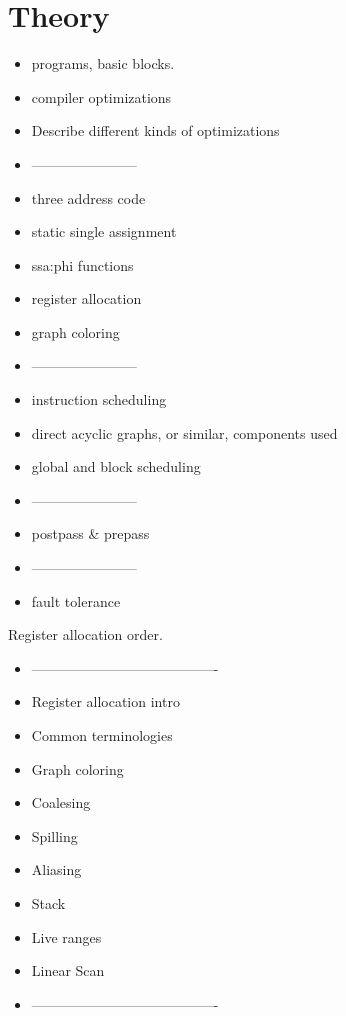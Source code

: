 \chapter{Theory}

\begin{itemize}
    \item programs, basic blocks.
    \item compiler optimizations
    \item Describe different kinds of optimizations
    \item -----------------------
    \item three address code
    \item static single assignment
    \item ssa:phi functions
    \item register allocation
    \item graph coloring 
    \item -----------------------
    \item instruction scheduling
    \item direct acyclic graphs, or similar, components used
    \item global and block scheduling
    \item -----------------------
    \item postpass \& prepass
    \item -----------------------
    
    \item fault tolerance \\
\end{itemize}

Register allocation order.
\begin{itemize}
    \item ----------------------------------------
    \item Register allocation intro
    \item Common terminologies
    \item Graph coloring
    \item Coalesing
    \item Spilling
    \item Aliasing
    \item Stack
    \item Live ranges
    \item Linear Scan
    \item ----------------------------------------\\
\end{itemize}

